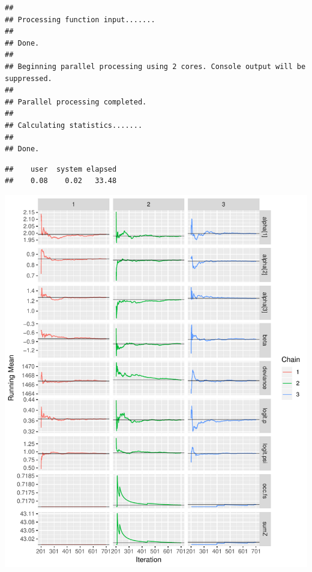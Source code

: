 \documentclass[]{book}
\newenvironment{Shaded}{\begin{snugshade}}{\end{snugshade}}
\newcommand{\KeywordTok}[1]{\textcolor[rgb]{0.13,0.29,0.53}{\textbf{{#1}}}}
\newcommand{\StringTok}[1]{\textcolor[rgb]{0.31,0.60,0.02}{{#1}}}
\newcommand{\CommentTok}[1]{\textcolor[rgb]{0.56,0.35,0.01}{\textit{{#1}}}}
\newcommand{\NormalTok}[1]{{#1}}
\begin{document}
\begin{verbatim}
## 
## Processing function input....... 
## 
## Done. 
##  
## Beginning parallel processing using 2 cores. Console output will be suppressed.
## 
## Parallel processing completed.
## 
## Calculating statistics....... 
## 
## Done.
\end{verbatim}

\begin{verbatim}
##    user  system elapsed 
##    0.08    0.02   33.48
\end{verbatim}

\begin{Shaded}
\end{Shaded}

\includegraphics{Simul-Machalilla-book_files/figure-latex/Bayesian-1.pdf}
\end{document}
